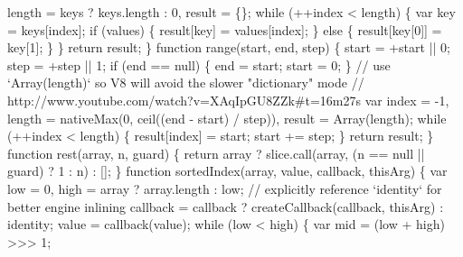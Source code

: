 \begin{DoxyCodeInclude}
{{\textcolor{stringliteral}{        length = keys ? keys.length : 0,}
\textcolor{stringliteral}{        result = \{\};}
\textcolor{stringliteral}{}
\textcolor{stringliteral}{    while (++index < length) \{}
\textcolor{stringliteral}{      var key = keys[index];}
\textcolor{stringliteral}{      if (values) \{}
\textcolor{stringliteral}{        result[key] = values[index];}
\textcolor{stringliteral}{      \} else \{}
\textcolor{stringliteral}{        result[key[0]] = key[1];}
\textcolor{stringliteral}{      \}}
\textcolor{stringliteral}{    \}}
\textcolor{stringliteral}{    return result;}
\textcolor{stringliteral}{  \}}
\textcolor{stringliteral}{}
\textcolor{stringliteral}{  function range(start, end, step) \{}
\textcolor{stringliteral}{    start = +start || 0;}
\textcolor{stringliteral}{    step = +step || 1;}
\textcolor{stringliteral}{}
\textcolor{stringliteral}{    if (end == null) \{}
\textcolor{stringliteral}{      end = start;}
\textcolor{stringliteral}{      start = 0;}
\textcolor{stringliteral}{    \}}
\textcolor{stringliteral}{    // use `Array(length)` so V8 will avoid the slower "}dictionary\textcolor{stringliteral}{" mode}
\textcolor{stringliteral}{    // http://www.youtube.com/watch?v=XAqIpGU8ZZk#t=16m27s}
\textcolor{stringliteral}{    var index = -1,}
\textcolor{stringliteral}{        length = nativeMax(0, ceil((end - start) / step)),}
\textcolor{stringliteral}{        result = Array(length);}
\textcolor{stringliteral}{}
\textcolor{stringliteral}{    while (++index < length) \{}
\textcolor{stringliteral}{      result[index] = start;}
\textcolor{stringliteral}{      start += step;}
\textcolor{stringliteral}{    \}}
\textcolor{stringliteral}{    return result;}
\textcolor{stringliteral}{  \}}
\textcolor{stringliteral}{}
\textcolor{stringliteral}{  function rest(array, n, guard) \{}
\textcolor{stringliteral}{    return array}
\textcolor{stringliteral}{      ? slice.call(array, (n == null || guard) ? 1 : n)}
\textcolor{stringliteral}{      : [];}
\textcolor{stringliteral}{  \}}
\textcolor{stringliteral}{}
\textcolor{stringliteral}{  function sortedIndex(array, value, callback, thisArg) \{}
\textcolor{stringliteral}{    var low = 0,}
\textcolor{stringliteral}{        high = array ? array.length : low;}
\textcolor{stringliteral}{}
\textcolor{stringliteral}{    // explicitly reference `identity` for better engine inlining}
\textcolor{stringliteral}{    callback = callback ? createCallback(callback, thisArg) : identity;}
\textcolor{stringliteral}{    value = callback(value);}
\textcolor{stringliteral}{    while (low < high) \{}
\textcolor{stringliteral}{      var mid = (low + high) >>> 1;}
}}
\end{DoxyCodeInclude}

